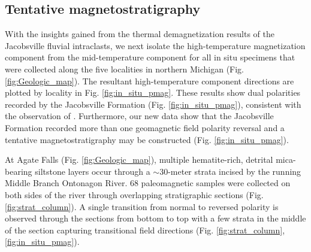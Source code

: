 \documentclass[draft]{agujournal2019}
\begin{document}
\subsection*{Tentative magnetostratigraphy}
\label{magstrat}
With the insights gained from the thermal demagnetization results of the Jacobsville fluvial intraclasts, we next isolate the high-temperature magnetization component from the mid-temperature component for all in situ specimens that were collected along the five localities in northern Michigan (Fig. \ref{fig:Geologic_map}). The resultant high-temperature component directions are plotted by locality in Fig. \ref{fig:in_situ_pmag}. These results show dual polarities recorded by the Jacobsville Formation (Fig. \ref{fig:in_situ_pmag}), consistent with the observation of . Furthermore, our new data show that the Jacobsville Formation recorded more than one geomagnetic field polarity reversal and a tentative magnetostratigraphy may be constructed (Fig. \ref{fig:in_situ_pmag}). 

At Agate Falls (Fig. \ref{fig:Geologic_map}), multiple hematite-rich, detrital mica-bearing siltstone layers occur through a $\sim$30-meter strata incised by the running Middle Branch Ontonagon River. 68 paleomagnetic samples were collected on both sides of the river through overlapping stratigraphic sections (Fig. \ref{fig:strat_column}). A single transition from normal to reversed polarity is observed through the sections from bottom to top with a few strata in the middle of the section capturing transitional field directions (Fig. \ref{fig:strat_column}, \ref{fig:in_situ_pmag}). 
\end{document}
